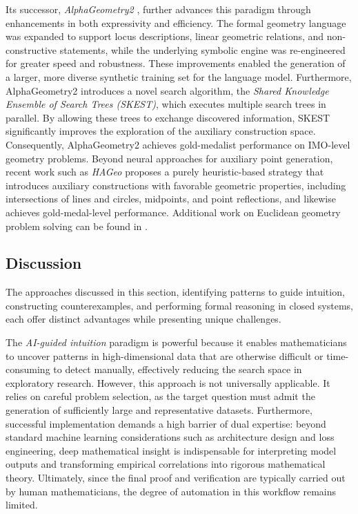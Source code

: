 \documentclass[11pt]{article}
\numberwithin{equation}{section}
\begin{document}
Its successor, \textit{AlphaGeometry2} \cite{chervonyi2025gold}, further advances this paradigm through enhancements in both expressivity and efficiency. The formal geometry language was expanded to support locus descriptions, linear geometric relations, and non-constructive statements, while the underlying symbolic engine was re-engineered for greater speed and robustness. These improvements enabled the generation of a larger, more diverse synthetic training set for the language model. Furthermore, AlphaGeometry2 introduces a novel search algorithm, the \textit{Shared Knowledge Ensemble of Search Trees (SKEST)}, which executes multiple search trees in parallel. By allowing these trees to exchange discovered information, SKEST significantly improves the exploration of the auxiliary construction space. Consequently, AlphaGeometry2 achieves gold-medalist performance on IMO-level geometry problems. Beyond neural approaches for auxiliary point generation, recent work such as \textit{HAGeo} \cite{duan2025gold} proposes a purely heuristic-based strategy that introduces auxiliary constructions with favorable geometric properties, including intersections of lines and circles, midpoints, and point reflections, and likewise achieves gold-medal-level performance. Additional work on Euclidean geometry problem solving can be found in \cite{zhang2023formalgeo,he2024fgeo,zou2024fgeo,zhang2024fgeo,zhang2024proposing}.



\subsection{Discussion}

The approaches discussed in this section, identifying patterns to guide intuition, constructing counterexamples, and performing formal reasoning in closed systems, each offer distinct advantages while presenting unique challenges.

The \textit{AI-guided intuition} paradigm is powerful because it enables mathematicians to uncover patterns in high-dimensional data that are otherwise difficult or time-consuming to detect manually, effectively reducing the search space in exploratory research. However, this approach is not universally applicable. It relies on careful problem selection, as the target question must admit the generation of sufficiently large and representative datasets. Furthermore, successful implementation demands a high barrier of dual expertise: beyond standard machine learning considerations such as architecture design and loss engineering, deep mathematical insight is indispensable for interpreting model outputs and transforming empirical correlations into rigorous mathematical theory. Ultimately, since the final proof and verification are typically carried out by human mathematicians, the degree of automation in this workflow remains limited.
\end{document}
